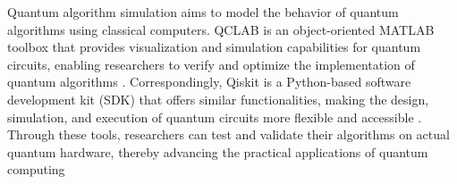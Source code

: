 \documentclass{article}
\begin{document}
    Quantum algorithm simulation aims to model the behavior of quantum algorithms using classical computers.
    QCLAB \cite{keip2025qclab} is an object-oriented MATLAB toolbox that provides visualization and simulation capabilities for quantum circuits, enabling researchers to verify and optimize the implementation of quantum algorithms .
    Correspondingly, Qiskit\cite{wille2019ibm} is a Python-based software development kit (SDK) that offers similar functionalities, making the design, simulation, and execution of quantum circuits more flexible and accessible .
    Through these tools, researchers can test and validate their algorithms on actual quantum hardware, thereby advancing the practical applications of quantum computing






    
    
\end{document}
